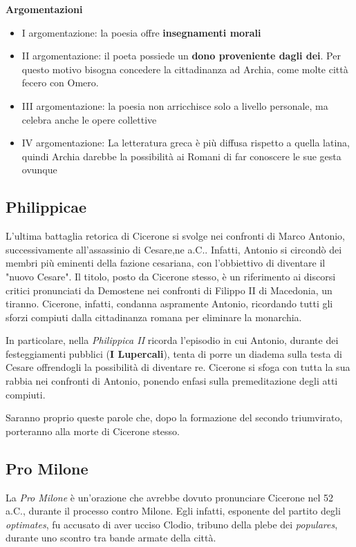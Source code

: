 \documentclass[10pt,a4paper]{article}
\begin{document}
\textbf{Argomentazioni}

\begin{itemize}
	\item I argomentazione: la poesia offre \textbf{insegnamenti morali}
	\item II argomentazione: il poeta possiede un \textbf{dono proveniente dagli dei}. Per questo motivo bisogna concedere la cittadinanza ad Archia, come molte città fecero con Omero.
	\item III argomentazione: la poesia non arricchisce solo a livello personale, ma celebra anche le opere collettive
	\item IV argomentazione: La letteratura greca è più diffusa rispetto a quella latina, quindi Archia darebbe la possibilità ai Romani di far conoscere le sue gesta ovunque
\end{itemize}

\subsection*{Philippicae}

L'ultima battaglia retorica di Cicerone si svolge nei confronti di Marco Antonio, successivamente all'assassinio di Cesare,ne a.C.. Infatti, Antonio si circondò dei membri più eminenti della fazione cesariana, con l'obbiettivo di diventare il "nuovo Cesare". Il titolo, posto da Cicerone stesso, è un riferimento ai discorsi critici pronunciati da Demostene nei confronti di Filippo II di Macedonia, un tiranno. Cicerone, infatti, condanna aspramente Antonio, ricordando tutti gli sforzi compiuti dalla cittadinanza romana per eliminare la monarchia. 

In particolare, nella \textit{Philippica II} ricorda l'episodio in cui Antonio, durante dei festeggiamenti pubblici (\textbf{I Lupercali}), tenta di porre un diadema sulla testa di Cesare offrendogli la possibilità di diventare re. Cicerone si sfoga con tutta la sua rabbia nei confronti di Antonio, ponendo enfasi sulla premeditazione degli atti compiuti. 

Saranno proprio queste parole che, dopo la formazione del secondo triumvirato, porteranno alla morte di Cicerone stesso.

\subsection*{Pro Milone}

La \textit{Pro Milone} è un'orazione che avrebbe dovuto pronunciare Cicerone nel 52 a.C., durante il processo contro Milone. Egli infatti, esponente del partito degli \textit{optimates}, fu accusato di aver ucciso Clodio, tribuno della plebe dei \textit{populares}, durante uno scontro tra bande armate della città. 
\end{document}
